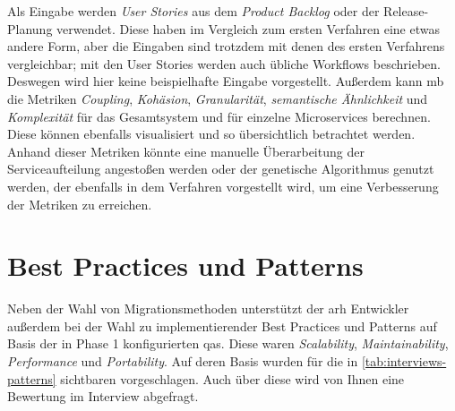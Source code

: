 Als Eingabe werden \emph{User Stories} aus dem \emph{Product Backlog} oder der Release-Planung verwendet.
Diese haben im Vergleich zum ersten Verfahren eine etwas andere Form, aber die Eingaben sind trotzdem mit denen des ersten Verfahrens vergleichbar; mit den User Stories werden auch übliche Workflows beschrieben.
Deswegen wird hier keine beispielhafte Eingabe vorgestellt.
Außerdem kann \gls{mb} die Metriken  \emph{Coupling}, \emph{Kohäsion}, \emph{Granularität}, \emph{semantische Ähnlichkeit} und \emph{Komplexität} für das Gesamtsystem und für einzelne Microservices berechnen.
Diese können ebenfalls visualisiert und so übersichtlich betrachtet werden.
Anhand dieser Metriken könnte eine manuelle Überarbeitung der Serviceaufteilung angestoßen werden oder der genetische Algorithmus genutzt werden, der ebenfalls in dem Verfahren vorgestellt wird, um eine Verbesserung der Metriken zu erreichen.

\section{Best Practices und Patterns}

Neben der Wahl von Migrationsmethoden unterstützt der \gls{arh} Entwickler außerdem bei der Wahl zu implementierender Best Practices und Patterns auf Basis der in Phase 1 konfigurierten \glspl{qa}.
Diese waren \emph{Scalability}, \emph{Maintainability}, \emph{Performance} und \emph{Portability}.
Auf deren Basis wurden für \jf die in \cref{tab:interviews-patterns} sichtbaren \bpp vorgeschlagen.
Auch über diese wird von Ihnen eine Bewertung im Interview abgefragt.

